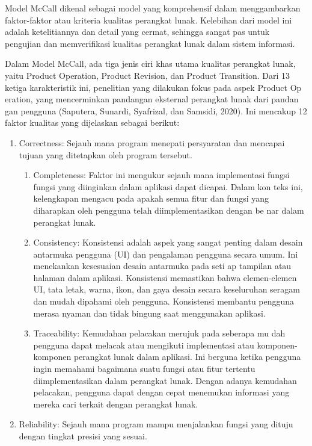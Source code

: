Model McCall dikenal sebagai model yang komprehensif dalam menggambarkan faktor-faktor atau kriteria kualitas perangkat lunak. Kelebihan dari model ini adalah ketelitiannya dan detail yang cermat, sehingga sangat pas untuk pengujian dan memverifikasi kualitas perangkat lunak dalam sistem informasi. 

Dalam Model McCall, ada tiga jenis ciri khas utama kualitas perangkat lunak, yaitu Product Operation, Product Revision, dan Product Transition. Dari 13 ketiga karakteristik ini, penelitian yang dilakukan fokus pada aspek Product Op eration, yang mencerminkan pandangan eksternal perangkat lunak dari pandan gan pengguna (Saputera, Sunardi, Syafrizal, dan Samsidi, 2020). Ini mencakup 12 faktor kualitas yang dijelaskan sebagai berikut: 

\begin{enumerate}
	\item Correctness: Sejauh mana program menepati persyaratan dan mencapai tujuan yang ditetapkan oleh program tersebut. 
	\begin{enumerate}[label=(\alph*)]
		\item Completeness: Faktor ini mengukur sejauh mana implementasi fungsi fungsi yang diinginkan dalam aplikasi dapat dicapai. Dalam kon teks ini, kelengkapan mengacu pada apakah semua fitur dan fungsi yang diharapkan oleh pengguna telah diimplementasikan dengan be nar dalam perangkat lunak. 
		\item Consistency: Konsistensi adalah aspek yang sangat penting dalam desain antarmuka pengguna (UI) dan pengalaman pengguna secara umum. Ini menekankan kesesuaian desain antarmuka pada seti ap tampilan atau halaman dalam aplikasi. Konsistensi memastikan bahwa elemen-elemen UI, tata letak, warna, ikon, dan gaya desain secara keseluruhan seragam dan mudah dipahami oleh pengguna. Konsistensi membantu pengguna merasa nyaman dan tidak bingung saat menggunakan aplikasi. 
		\item Traceability: Kemudahan pelacakan merujuk pada seberapa mu dah pengguna dapat melacak atau mengikuti implementasi atau komponen-komponen perangkat lunak dalam aplikasi. Ini berguna ketika pengguna ingin memahami bagaimana suatu fungsi atau fitur tertentu diimplementasikan dalam perangkat lunak. Dengan adanya kemudahan pelacakan, pengguna dapat dengan cepat menemukan informasi yang mereka cari terkait dengan perangkat lunak. 
\end{enumerate}
	\item Reliability: Sejauh mana program mampu menjalankan fungsi yang dituju dengan tingkat presisi yang sesuai. 

\end{enumerate}

